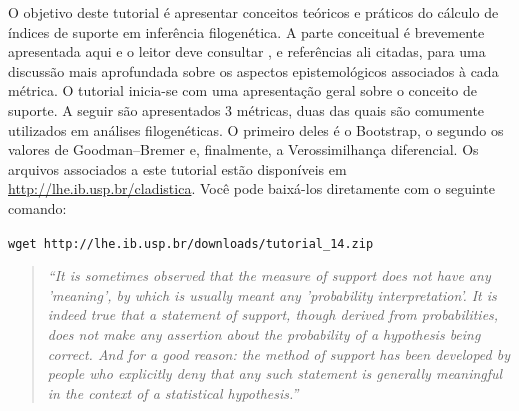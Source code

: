 \begin{refsection}
\renewcommand*{\finalnamedelim}{\addspace\&\space} %

O objetivo deste tutorial é apresentar conceitos teóricos e práticos do cálculo de índices de suporte em inferência filogenética. A parte conceitual é brevemente apresentada aqui e o leitor deve consultar \textcite{GrantKluge2008b}, e referências ali citadas, para uma discussão mais aprofundada sobre os aspectos epistemológicos associados à cada métrica. O tutorial inicia-se com uma apresentação geral sobre o conceito de suporte. A seguir são apresentados 3 métricas, duas das quais são comumente utilizados em análises filogenéticas. O primeiro deles é o Bootstrap, o segundo os valores de Goodman--Bremer e, finalmente, a Verossimilhança diferencial. Os arquivos associados a este tutorial estão disponíveis em \url{http://lhe.ib.usp.br/cladistica}. Você pode baixá-los diretamente com o seguinte comando:

\begin{center}
\small \texttt{wget http://lhe.ib.usp.br/downloads/tutorial\_14.zip}\\
\end{center}



\newpage
\pagestyle{fancy} %
\newcommand{\A}{\textcolor{green}{\textbf{A}}}
\newcommand{\C}{\textcolor{blue}{\textbf{C}}}
\newcommand{\G}{\textcolor{gray}{\textbf{G}}}
\newcommand{\T}{\textcolor{red}{\textbf{T}}}
\newcommand{\gap}{\textcolor{black}{\textbf{-}}}





\begin{quote}
\scriptsize\textit{``It is sometimes observed that the measure of support does not have any 'meaning', by which is usually meant any 'probability interpretation'. It is indeed true that a statement of support, though derived from probabilities, does not make any assertion about the probability of a hypothesis being correct. And for a good reason: the method of support has been developed by people who explicitly deny that any such statement is generally meaningful in the context of a statistical hypothesis.''} \parencite[][:33]{Edwards_1992}
\end{quote}


\end{refsection}
